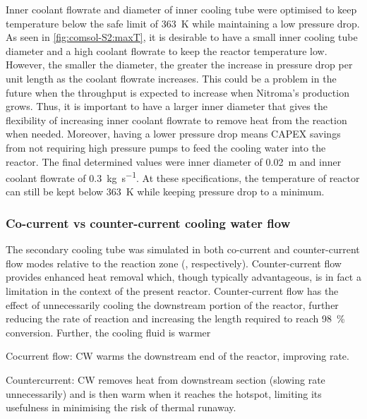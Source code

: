 Inner coolant flowrate and diameter of inner cooling tube were optimised to keep temperature below the safe limit of \SI{363}{\K} while maintaining a low pressure drop. As seen in \cref{fig:comsol-S2:maxT}, it is desirable to have a small inner cooling tube diameter and a high coolant flowrate to keep the reactor temperature low. However, the smaller the diameter, the greater the increase in pressure drop per unit length as the coolant flowrate increases. This could be a problem in the future when the throughput is expected to increase when Nitroma's production grows. Thus, it is important to have a larger inner diameter that gives the flexibility of increasing inner coolant flowrate to remove heat from the reaction when needed. Moreover, having a lower pressure drop means CAPEX savings from not requiring high pressure pumps to feed the cooling water into the reactor. The final determined values were inner diameter of \SI{0.02}{\m} and inner coolant flowrate of \SI{0.3}{\kg\per\s}. At these specifications, the temperature of reactor can still be kept below \SI{363}{\K} while keeping pressure drop to a minimum.

\subsubsection{Co-current vs counter-current cooling water flow}
The secondary cooling tube was simulated in both co-current and counter-current flow modes relative to the reaction zone (\label{fig:comsol-temperature:lines,fig:comsol-temperature:lines:countercurrent}, respectively). Counter-current flow provides enhanced heat removal which, though typically advantageous, is in fact a limitation in the context of the present reactor. Counter-current flow has the effect of unnecessarily cooling the downstream portion of the reactor, further reducing the rate of reaction and increasing the length required to reach \SI{98}{\percent} conversion. Further, the cooling fluid is warmer 

Cocurrent flow: CW warms the downstream end of the reactor, improving rate.

Countercurrent: CW removes heat from downstream section (slowing rate unnecessarily) and is then warm when it reaches the hotspot, limiting its usefulness in minimising the risk of thermal runaway.

